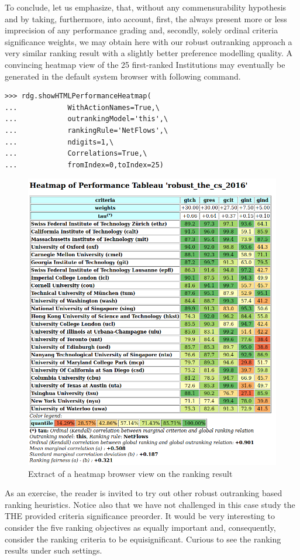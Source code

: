 To conclude, let us emphasize, that, without any commensurability hypothesis and by taking, furthermore, into account, first, the always present more or less imprecision of any performance grading and, secondly, solely ordinal criteria significance weights, we may obtain here with our robust outranking approach a very similar ranking result with a slightly better preference modelling quality. A convincing heatmap view of the 25 first-ranked Institutions may eventually be generated in the default system browser with following command.
\begin{lstlisting}
>>> rdg.showHTMLPerformanceHeatmap(
...            WithActionNames=True,\
...            outrankingModel='this',\
...            rankingRule='NetFlows',\
...            ndigits=1,\
...            Correlations=True,\
...            fromIndex=0,toIndex=25)
\end{lstlisting}
\begin{figure}[h]
\includegraphics[width=\hsize]{Figures/13-4-theHeatmap.png}
\caption{Extract of a heatmap browser view on the \NetFlows ranking result}
\label{fig:13.4}       %
\end{figure}

As an exercise, the reader is invited to try out other robust outranking based ranking heuristics. Notice also that we have not challenged in this case study the THE provided criteria significance preorder. It would be very interesting to consider the five ranking objectives as equally important and, consequently, consider the ranking criteria to be equisignificant. Curious to see the ranking results under such settings.
 
\clearpage


%